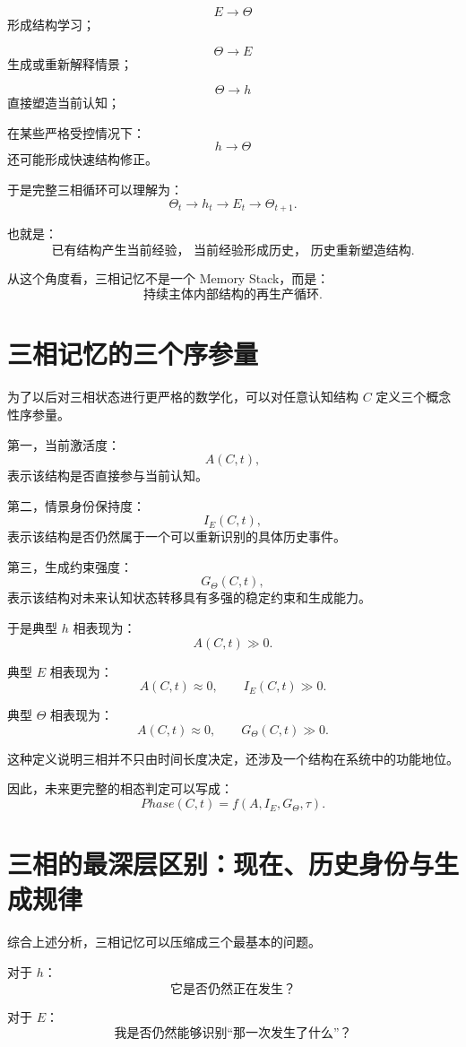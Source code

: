 \[
E\rightarrow\Theta
\]
形成结构学习；

\[
\Theta\rightarrow E
\]
生成或重新解释情景；

\[
\Theta\rightarrow h
\]
直接塑造当前认知；

在某些严格受控情况下：
\[
h\rightarrow\Theta
\]
还可能形成快速结构修正。

于是完整三相循环可以理解为：
\[
\boxed{
\Theta_t
\rightarrow
h_t
\rightarrow
E_t
\rightarrow
\Theta_{t+1}.
}
\]

也就是：
\[
\boxed{
\text{已有结构产生当前经验，
当前经验形成历史，
历史重新塑造结构}.
}
\]

从这个角度看，三相记忆不是一个 Memory Stack，而是：
\[
\boxed{
\text{持续主体内部结构的再生产循环}.
}
\]

\section{三相记忆的三个序参量}

为了以后对三相状态进行更严格的数学化，可以对任意认知结构 $C$ 定义三个概念性序参量。

第一，当前激活度：
\[
A(C,t),
\]
表示该结构是否直接参与当前认知。

第二，情景身份保持度：
\[
I_E(C,t),
\]
表示该结构是否仍然属于一个可以重新识别的具体历史事件。

第三，生成约束强度：
\[
G_\Theta(C,t),
\]
表示该结构对未来认知状态转移具有多强的稳定约束和生成能力。

于是典型 $h$ 相表现为：
\[
A(C,t)\gg0.
\]

典型 $E$ 相表现为：
\[
A(C,t)\approx0,
\qquad
I_E(C,t)\gg0.
\]

典型 $\Theta$ 相表现为：
\[
A(C,t)\approx0,
\qquad
G_\Theta(C,t)\gg0.
\]

这种定义说明三相并不只由时间长度决定，还涉及一个结构在系统中的功能地位。

因此，未来更完整的相态判定可以写成：
\[
\boxed{
Phase(C,t)
=
f(
A,
I_E,
G_\Theta,
\tau
).
}
\]

\section{三相的最深层区别：现在、历史身份与生成规律}

综合上述分析，三相记忆可以压缩成三个最基本的问题。

对于 $h$：
\[
\boxed{
\text{它是否仍然正在发生？}
}
\]

对于 $E$：
\[
\boxed{
\text{我是否仍然能够识别“那一次发生了什么”？}
}
\]

